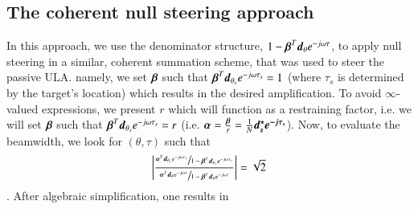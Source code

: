 \subsection{The coherent null steering approach}
In this approach, we use the denominator structure, $ 1 - \boldsymbol{\beta}^{T}\boldsymbol{d}_{\theta}e^{-j\omega\tau} $, to apply null steering in a similar, coherent summation scheme, that was used to steer the passive ULA. namely, we set $ \boldsymbol{\beta} $ such that $ \boldsymbol{\beta}^{T}\boldsymbol{d}_{\theta_{s}}e^{-j\omega\tau_{s}} = 1 $ (where $\tau_{s}$ is determined by the target's location) which results in the desired amplification. To avoid $\infty$-valued expressions, we present $r$ which will function as a restraining factor, i.e. we will set $ \boldsymbol{\beta} $ such that $ \boldsymbol{\beta}^{T}\boldsymbol{d}_{\theta_{s}}e^{-j\omega\tau_{s}} = r $ (i.e. $ \boldsymbol{\alpha} = \frac{\boldsymbol{\beta}}{r} = \frac{1}{N}\boldsymbol{d^{*}_{s}e^{-j\tau_{s}}} $). Now, to evaluate the beamwidth, we look for $\left(\theta,\tau\right)$ such that 
$$
\left|
\frac{
\sfrac
{
\boldsymbol{\alpha}^{T}\boldsymbol{d}_{\theta_{s}}e^{-j\omega\tau_{s}}
}
{
1-\boldsymbol{\beta}^{T}\boldsymbol{d}_{\theta_{s}}e^{-j\omega\tau_{s}}
}
}{
\sfrac
{
\boldsymbol{\alpha}^{T}\boldsymbol{d}_{\theta}e^{-j\omega\tau}
}
{
1-\boldsymbol{\beta}^{T}\boldsymbol{d}_{\theta}e^{-j\omega\tau}
}
}
\right|
=
\sqrt{2}
$$.
After algebraic simplification, one results in
\ifdefined\showDev
    \\
